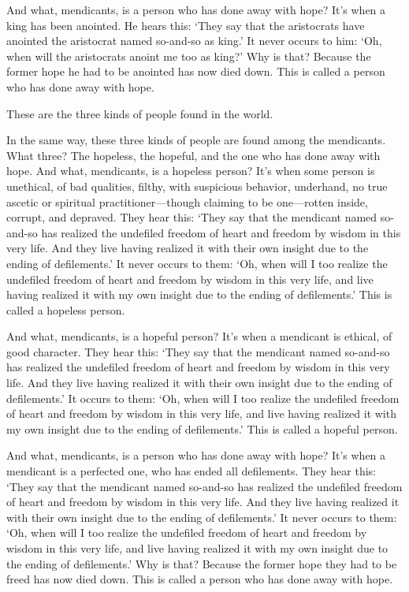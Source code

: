 \documentclass[12pt,openany]{book}%
\begin{document}
And what, mendicants, is a person who has done away with hope? It’s when a king has been anointed. He hears this: ‘They say that the aristocrats have anointed the aristocrat named so-and-so as king.’ It never occurs to him: ‘Oh, when will the aristocrats anoint me too as king?’ Why is that? Because the former hope he had to be anointed has now died down. This is called a person who has done away with hope. 

These are the three kinds of people found in the world. 

In the same way, these three kinds of people are found among the mendicants. What three? The hopeless, the hopeful, and the one who has done away with hope. And what, mendicants, is a hopeless person? It’s when some person is unethical, of bad qualities, filthy, with suspicious behavior, underhand, no true ascetic or spiritual practitioner—though claiming to be one—rotten inside, corrupt, and depraved. They hear this: ‘They say that the mendicant named so-and-so has realized the undefiled freedom of heart and freedom by wisdom in this very life. And they live having realized it with their own insight due to the ending of defilements.’ It never occurs to them: ‘Oh, when will I too realize the undefiled freedom of heart and freedom by wisdom in this very life, and live having realized it with my own insight due to the ending of defilements.’ This is called a hopeless person. 

And what, mendicants, is a hopeful person? It’s when a mendicant is ethical, of good character. They hear this: ‘They say that the mendicant named so-and-so has realized the undefiled freedom of heart and freedom by wisdom in this very life. And they live having realized it with their own insight due to the ending of defilements.’ It occurs to them: ‘Oh, when will I too realize the undefiled freedom of heart and freedom by wisdom in this very life, and live having realized it with my own insight due to the ending of defilements.’ This is called a hopeful person. 

And what, mendicants, is a person who has done away with hope? It’s when a mendicant is a perfected one, who has ended all defilements. They hear this: ‘They say that the mendicant named so-and-so has realized the undefiled freedom of heart and freedom by wisdom in this very life. And they live having realized it with their own insight due to the ending of defilements.’ It never occurs to them: ‘Oh, when will I too realize the undefiled freedom of heart and freedom by wisdom in this very life, and live having realized it with my own insight due to the ending of defilements.’ Why is that? Because the former hope they had to be freed has now died down. This is called a person who has done away with hope. 
\end{document}
